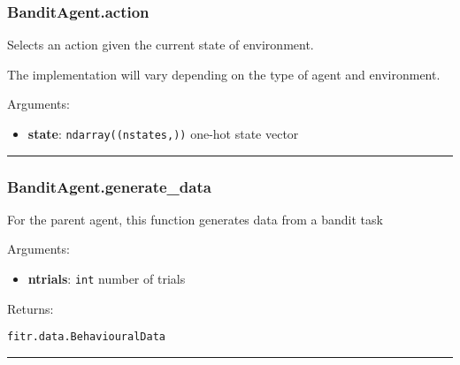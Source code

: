 \subsubsection{BanditAgent.action}\label{banditagent.action}

\begin{Shaded}
\begin{Highlighting}[]
\end{Highlighting}
\end{Shaded}

Selects an action given the current state of environment.

The implementation will vary depending on the type of agent and
environment.

Arguments:

\begin{itemize}
\tightlist
\item
  \textbf{state}: \texttt{ndarray((nstates,))} one-hot state vector
\end{itemize}

\begin{center}\rule{0.5\linewidth}{\linethickness}\end{center}

\subsubsection{BanditAgent.generate\_data}\label{banditagent.generate_data}

\begin{Shaded}
\begin{Highlighting}[]
\end{Highlighting}
\end{Shaded}

For the parent agent, this function generates data from a bandit task

Arguments:

\begin{itemize}
\tightlist
\item
  \textbf{ntrials}: \texttt{int} number of trials
\end{itemize}

Returns:

\texttt{fitr.data.BehaviouralData}

\begin{center}\rule{0.5\linewidth}{\linethickness}\end{center}

